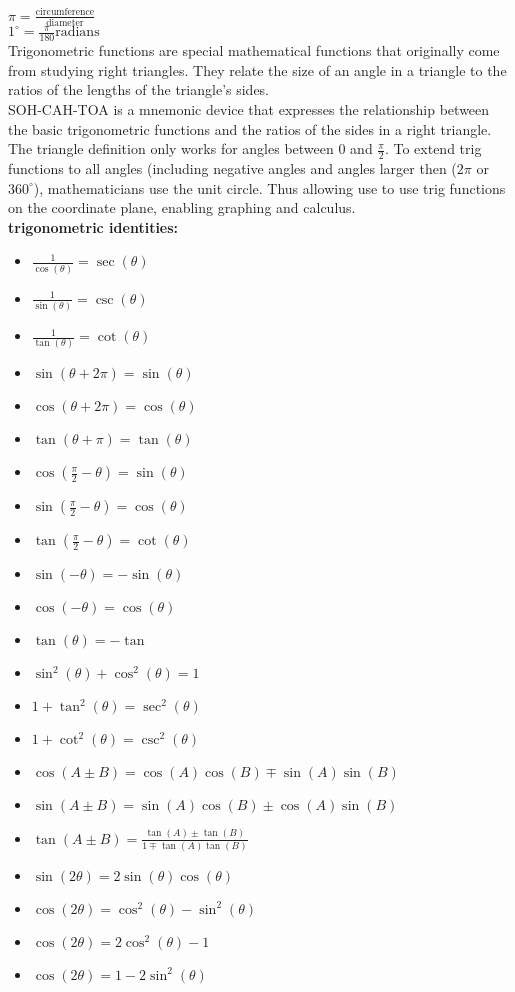 \documentclass{article}
\begin{document}
$\pi = \frac{\text{circumference}}{\text{diameter}}$\\
$1^\circ = \frac{\pi}{180} \text{radians}$\\

Trigonometric functions are special mathematical functions that originally come from studying right triangles. They relate the size of an angle in a triangle to the ratios of the lengths of the triangle's sides.\\

SOH-CAH-TOA is a mnemonic device that expresses the relationship between the basic trigonometric functions and the ratios of the sides in a right triangle.\\

The triangle definition only works for angles between 0 and $\frac{\pi}{2}$. To extend trig functions to all angles (including negative angles and angles larger then ($2\pi$ or $360^{\circ}$), mathematicians use the unit circle. Thus allowing use to use trig functions on the coordinate plane, enabling graphing and calculus.\\	

\textbf{trigonometric identities:}
\begin{itemize}
	\item $\frac{1}{\cos(\theta)} = \sec(\theta)$	
	\item $\frac{1}{\sin(\theta)} = \csc(\theta) $
	\item $\frac{1}{\tan(\theta)} = \cot(\theta)$
	\item $\sin(\theta + 2\pi) = \sin(\theta)$
	\item $\cos(\theta + 2\pi) = \cos(\theta)$
	\item $\tan(\theta + \pi) = \tan(\theta)$
	\item $\cos(\frac{\pi}{2} - \theta) = \sin(\theta)$
	\item $\sin(\frac{\pi}{2} - \theta) = \cos(\theta)$
	\item $\tan(\frac{\pi}{2} - \theta) = \cot(\theta)$
	\item $\sin(-\theta) = -\sin(\theta)$
	\item $\cos(-\theta) = \cos(\theta)$
	\item $\tan(\theta) = -\tan$
	\item $\sin^2(\theta) + \cos^2(\theta) = 1$
	\item $1 + \tan^2(\theta) = \sec^2(\theta)$
	\item $1 + \cot^2(\theta) = \csc^2(\theta)$
	\item $\cos(A \pm B) = \cos(A)\cos(B) \mp \sin(A)\sin(B)$		
	\item $\sin(A \pm B) = \sin(A)\cos(B) \pm \cos(A)\sin(B)$
	\item $\tan(A \pm B) = \frac{\tan(A) \pm \tan(B)}{1 \mp \tan(A)\tan(B)}$
	\item $\sin(2\theta) = 2\sin(\theta)\cos(\theta)$
	\item $\cos(2\theta) = \cos^2(\theta) - \sin^2(\theta)$		
	\item $\cos(2\theta) = 2\cos^2(\theta) - 1$
	\item $\cos(2\theta) = 1 - 2\sin^2(\theta)$
\end{itemize}
\end{document}
